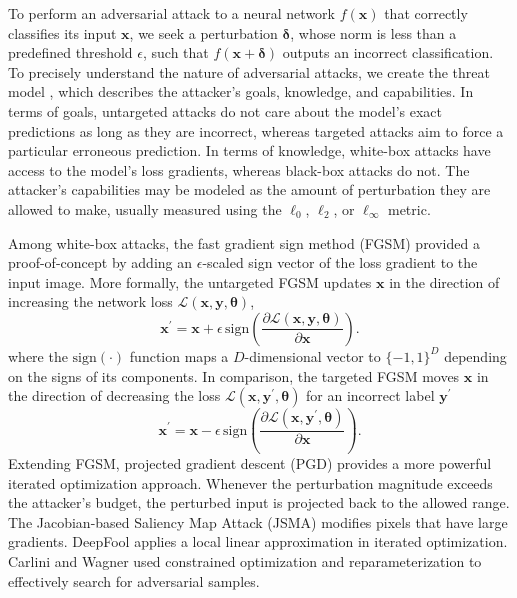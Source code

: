 To perform an adversarial attack to a neural network $f(\bm x)$ that correctly classifies its input $\bm x$, we seek a perturbation $\bm \delta$, whose norm is less than a predefined threshold $\epsilon$, such that $f(\bm x + \bm \delta)$ outputs an incorrect classification. 
%
To precisely understand the nature of adversarial attacks, we create the threat model \cite{carlini2019evaluating}, which describes the attacker's goals, knowledge, and capabilities. In terms of goals, untargeted attacks do not care about the model's exact predictions as long as they are incorrect, whereas targeted attacks aim to force a particular erroneous prediction. In terms of knowledge, white-box attacks have access to the model's loss gradients, whereas black-box attacks do not. The attacker's capabilities may be modeled as the amount of perturbation they are allowed to make, usually measured using the $\ell_0$, $\ell_2$, or $\ell_{\infty}$ metric.

Among white-box attacks, the fast gradient sign method (FGSM) \cite{explaining_harnessing_adv_egs} provided a proof-of-concept by adding an $\epsilon$-scaled sign vector of the loss gradient to the input image. More formally, the untargeted FGSM updates $\bm x$ in the direction of increasing the network loss $\mathcal{L}(\bm x, \bm y, \bm \theta)$,
\begin{equation}
\bm x^\prime = \bm x + \epsilon \, \text{sign}\left(\frac{\partial \mathcal{L}(\bm x, \bm y, \bm \theta)}{\partial \bm x}\right).
\end{equation}
where the $\text{sign}(\cdot)$ function maps a $D$-dimensional vector to $\{-1, 1\}^D$ depending on the signs of its components. 
In comparison, the targeted FGSM moves $\bm x$ in the direction of decreasing the loss $\mathcal{L}(\bm x, \bm y^\prime, \bm \theta)$ for an incorrect label $\bm y^\prime$
\begin{equation}
\bm x^\prime = \bm x - \epsilon \, \text{sign}\left(\frac{\partial \mathcal{L}(\bm x, \bm y^\prime, \bm \theta)}{\partial \bm x}\right).
\end{equation}
Extending FGSM, projected gradient descent (PGD) \cite{toward_robust_dnn} provides a more powerful iterated optimization approach. Whenever the perturbation magnitude exceeds the attacker's budget, the perturbed input is projected back to the allowed range. 
The Jacobian-based Saliency Map Attack (JSMA) \cite{jsma} modifies pixels that have large gradients. DeepFool \cite{deepfool} applies a local linear approximation in iterated optimization. Carlini and Wagner \cite{cw} used constrained optimization and reparameterization to effectively search for adversarial samples. 

